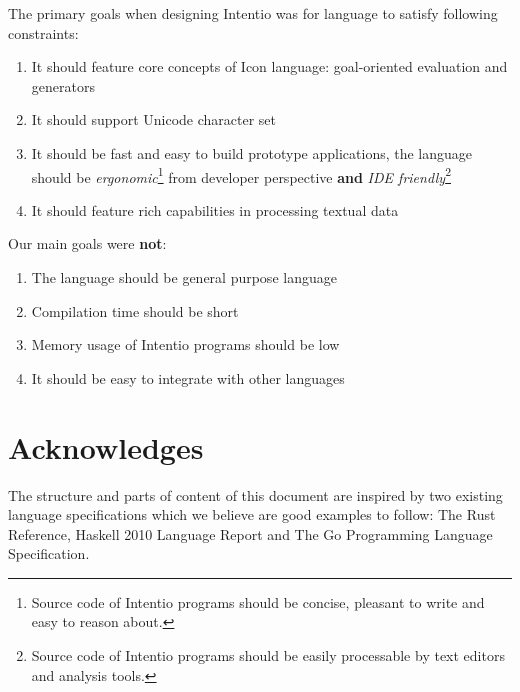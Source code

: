 The primary goals when designing Intentio was for language to satisfy following constraints:
\begin{enumerate}
  \item It should feature core concepts of Icon language: goal-oriented evaluation and generators
  \item It should support Unicode character set
  \item It should be fast and easy to build prototype applications, the language should be \emph{ergonomic}\footnote{Source code of Intentio programs should be concise, pleasant to write and easy to reason about.} from developer perspective \textbf{and} \emph{IDE friendly}\footnote{Source code of Intentio programs should be easily processable by text editors and analysis tools.}
  \item It should feature rich capabilities in processing textual data
\end{enumerate}

Our main goals were \textbf{not}:
\begin{enumerate}
  \item The language should be general purpose language
  \item Compilation time should be short
  \item Memory usage of Intentio programs should be low
  \item It should be easy to integrate with other languages
\end{enumerate}

\section*{Acknowledges}

The structure and parts of content of this document are inspired by two existing language specifications which we believe are good examples to follow: The Rust Reference\cite{TheRustReference}, Haskell 2010 Language Report\cite{Marlow_haskell2010} and The Go Programming Language Specification\cite{TheGoProgrammingLanguage}.
